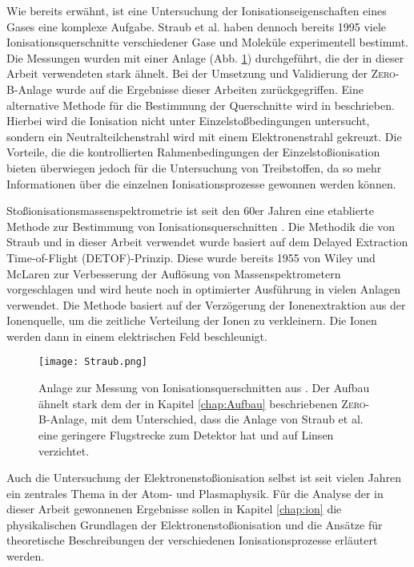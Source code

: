 Wie bereits erwähnt, ist eine Untersuchung der Ionisationseigenschaften eines Gases eine komplexe Aufgabe. Straub et al. \cite{Straub}\cite{Straub2} haben dennoch bereits 1995 viele Ionisationsquerschnitte verschiedener Gase und Moleküle experimentell bestimmt. Die Messungen wurden mit einer Anlage (Abb. \ref{fig:Straub}) durchgeführt, die der in dieser Arbeit verwendeten stark ähnelt. Bei der Umsetzung und Validierung der \textsc{Zero-B}-Anlage wurde auf die Ergebnisse dieser Arbeiten zurückgegriffen. Eine alternative Methode für die Bestimmung der Querschnitte wird in \cite{other_method} beschrieben. Hierbei wird die Ionisation nicht unter Einzelstoßbedingungen untersucht, sondern ein Neutralteilchenstrahl wird mit einem Elektronenstrahl gekreuzt. Die Vorteile, die die kontrollierten Rahmenbedingungen der Einzelstoßionisation bieten überwiegen jedoch für die Untersuchung von Treibstoffen, da so mehr Informationen über die einzelnen Ionisationsprozesse gewonnen werden können.

Stoßionisationsmassenspektrometrie ist seit den 60er Jahren eine etablierte Methode zur Bestimmung von Ionisationsquerschnitten \cite{EITOFMS}. Die Methodik die von Straub  und in dieser Arbeit verwendet wurde basiert auf dem Delayed Extraction Time-of-Flight (DETOF)-Prinzip. Diese wurde bereits 1955 von Wiley und McLaren zur Verbesserung der Auflösung von Massenspektrometern vorgeschlagen \cite{DETOF} und wird heute noch in optimierter Ausführung in vielen Anlagen verwendet. Die Methode basiert auf der Verzögerung der Ionenextraktion aus der Ionenquelle, um die zeitliche Verteilung der Ionen zu verkleinern. Die Ionen werden dann in einem elektrischen Feld beschleunigt.
\begin{figure}
    \centering
    \texttt{[image: Straub.png]}
    \caption[Anlage zur Messung von Ionisationsquerschnitten von Straub et al.]{Anlage zur Messung von Ionisationsquerschnitten aus \cite{Straub2}. Der Aufbau ähnelt stark dem der in Kapitel \ref{chap:Aufbau} beschriebenen \textsc{Zero-B}-Anlage, mit dem Unterschied, dass die Anlage von Straub et al. eine geringere Flugstrecke zum Detektor hat und auf Linsen verzichtet.}
    \label{fig:Straub}
\end{figure}
Auch die Untersuchung der Elektronenstoßionisation selbst ist seit vielen Jahren ein zentrales Thema in der Atom- und Plasmaphysik. Für die Analyse der in dieser Arbeit gewonnenen Ergebnisse sollen in Kapitel \ref{chap:ion} die physikalischen Grundlagen der Elektronenstoßionisation und die Ansätze für theoretische Beschreibungen der verschiedenen Ionisationsprozesse erläutert werden.